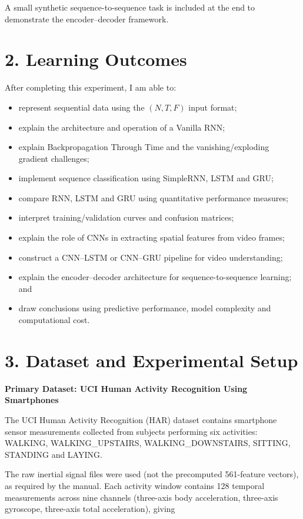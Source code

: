 \documentclass[10pt]{article}
\begin{document}
A small synthetic sequence-to-sequence task is included at the end to
demonstrate the encoder--decoder framework.

\section*{2. Learning Outcomes}

After completing this experiment, I am able to:

\begin{itemize}
\item represent sequential data using the $(N,T,F)$ input format;
\item explain the architecture and operation of a Vanilla RNN;
\item explain Backpropagation Through Time and the vanishing/exploding gradient challenges;
\item implement sequence classification using SimpleRNN, LSTM and GRU;
\item compare RNN, LSTM and GRU using quantitative performance measures;
\item interpret training/validation curves and confusion matrices;
\item explain the role of CNNs in extracting spatial features from video frames;
\item construct a CNN--LSTM or CNN--GRU pipeline for video understanding;
\item explain the encoder--decoder architecture for sequence-to-sequence learning; and
\item draw conclusions using predictive performance, model complexity and computational cost.
\end{itemize}

\section*{3. Dataset and Experimental Setup}

\textbf{Primary Dataset: UCI Human Activity Recognition Using Smartphones}

The UCI Human Activity Recognition (HAR) dataset contains smartphone sensor
measurements collected from subjects performing six activities: WALKING,
WALKING\_UPSTAIRS, WALKING\_DOWNSTAIRS, SITTING, STANDING and LAYING.

The raw inertial signal files were used (not the precomputed 561-feature
vectors), as required by the manual. Each activity window contains 128
temporal measurements across nine channels (three-axis body acceleration,
three-axis gyroscope, three-axis total acceleration), giving
\end{document}
